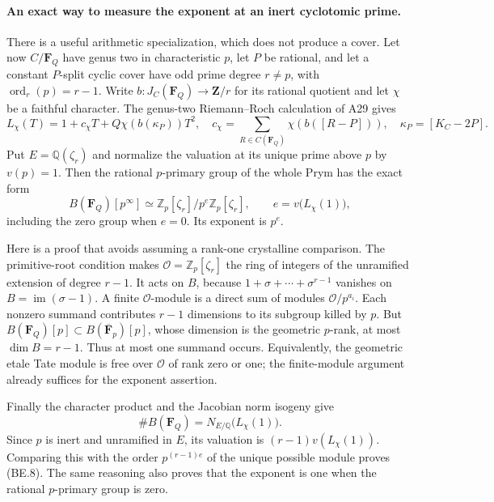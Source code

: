\documentclass[11pt,a4paper]{article}
\begin{document}
\paragraph{An exact way to measure the exponent at an inert cyclotomic prime.}
There is a useful arithmetic specialization, which does not
produce a cover. Let now $C/\mathbf F_Q$ have genus two in
characteristic $p$, let $P$ be rational, and let a constant
$P$-split cyclic cover have odd prime degree $r\ne p$, with
$\operatorname{ord}_r(p)=r-1$. Write $b:J_C(\mathbf F_Q)\to
\mathbf Z/r$ for its rational quotient and let $\chi$ be a
faithful character. The genus-two Riemann--Roch calculation
of A29 gives
\[
 L_\chi(T)=1+c_\chi T+Q\chi(b(\kappa_P))T^2,
 \quad c_\chi=\sum_{R\in C(\mathbf F_Q)}\chi(b([R-P])),
 \quad \kappa_P=[K_C-2P].
 \tag{BE.7}
\]
Put $E=\mathbb Q(\zeta_r)$ and normalize the valuation at
its unique prime above $p$ by $v(p)=1$. Then the rational
$p$-primary group of the whole Prym has the exact form
\[
 B(\mathbf F_Q)[p^\infty]\simeq
       \mathbb Z_p[\zeta_r]/p^e\mathbb Z_p[\zeta_r],
       \qquad e=v\bigl(L_\chi(1)\bigr),
 \tag{BE.8}
\]
including the zero group when $e=0$. Its exponent is $p^e$.

Here is a proof that avoids assuming a rank-one crystalline
comparison. The primitive-root condition makes
$\mathcal O=\mathbb Z_p[\zeta_r]$ the ring of integers of
the unramified extension of degree $r-1$. It acts on $B$,
because $1+\sigma+\cdots+\sigma^{r-1}$ vanishes on
$B=\operatorname{im}(\sigma-1)$. A finite $\mathcal O$-module
is a direct sum of modules $\mathcal O/p^{a_i}$.
Each nonzero summand contributes $r-1$ dimensions to its
subgroup killed by $p$. But
$B(\mathbf F_Q)[p]\subset B(\overline{\mathbf F}_p)[p]$,
whose dimension is the geometric $p$-rank, at most
$\dim B=r-1$. Thus at most one summand occurs.
Equivalently, the geometric etale Tate module is free over
$\mathcal O$ of rank zero or one; the finite-module argument
already suffices for the exponent assertion.

Finally the character product and the Jacobian norm isogeny
give
\[
 \#B(\mathbf F_Q)=N_{E/\mathbb Q}\bigl(L_\chi(1)\bigr).
\]
Since $p$ is inert and unramified in $E$, its valuation is
$(r-1)v(L_\chi(1))$. Comparing this with the order
$p^{(r-1)e}$ of the unique possible module proves (BE.8).
The same reasoning also proves that the exponent is one
when the rational $p$-primary group is zero.
\end{document}
